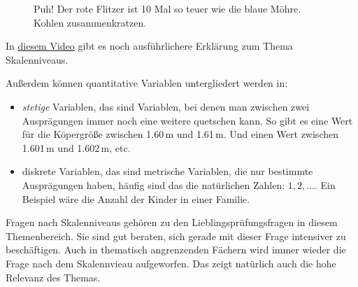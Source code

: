 \documentclass[
  a4paper,
  DIV=11]{scrreprt}
\providecommand{\tightlist}{%
  \setlength{\itemsep}{0pt}\setlength{\parskip}{0pt}}\usepackage{longtable,booktabs,array}
\theoremstyle{definition}
\theoremstyle{definition}
\theoremstyle{definition}
\theoremstyle{remark}
\begin{document}
\begin{figure}


\caption{\label{fig-verhaeltnis}Puh! Der rote Flitzer ist 10 Mal so
teuer wie die blaue Möhre. Kohlen zusammenkratzen.}

\end{figure}%

In \href{https://www.youtube.com/watch?v=_mN3kFe56ng}{diesem Video} gibt
es noch ausführlichere Erklärung zum Thema Skalenniveaus.

Außerdem können quantitative Variablen untergliedert werden in:

\begin{itemize}
\tightlist
\item
  \emph{stetige} Variablen, das sind Variablen, bei denen man zwischen
  zwei Ausprägungen immer noch eine weitere quetschen kann. So gibt es
  eine Wert für die Köpergröße zwischen 1.60\,m und 1.61\,m. Und einen
  Wert zwischen 1.601\,m und 1.602\,m, etc.
\item
  diskrete Variablen, das sind metrische Variablen, die nur bestimmte
  Ausprägungen haben, häufig sind das die natürlichen Zahlen:
  \(1,2,...\). Ein Beispiel wäre die Anzahl der Kinder in einer Familie.
\end{itemize}

\begin{tcolorbox}[enhanced jigsaw, toptitle=1mm, rightrule=.15mm, colbacktitle=quarto-callout-tip-color!10!white, breakable, title=\textcolor{quarto-callout-tip-color}{\faLightbulb}\hspace{0.5em}{Tipp}, bottomrule=.15mm, colback=white, opacitybacktitle=0.6, left=2mm, titlerule=0mm, toprule=.15mm, coltitle=black, opacityback=0, bottomtitle=1mm, arc=.35mm, leftrule=.75mm, colframe=quarto-callout-tip-color-frame]

Fragen nach Skalenniveaus gehören zu den Lieblingsprüfungsfragen in
diesem Themenbereich. Sie sind gut beraten, sich gerade mit dieser Frage
intensiver zu beschäftigen. Auch in thematisch angrenzenden Fächern wird
immer wieder die Frage nach dem Skalennvieau aufgeworfen. Das zeigt
natürlich auch die hohe Relevanz des Themas.

\end{tcolorbox}
\end{document}
